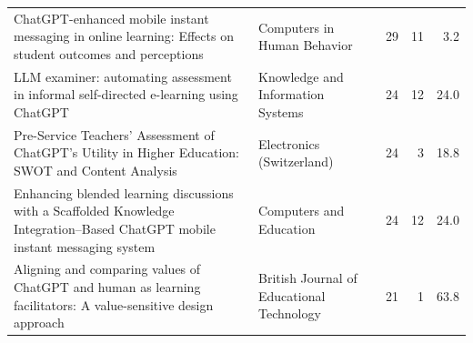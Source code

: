 \begin{table}[htbp]
{\begin{tabular}{@{}p{7cm}p{4cm}rrr@{}}
\rowcolor{white}
ChatGPT-enhanced mobile instant messaging in online learning: Effects on student outcomes and perceptions & Computers in Human Behavior & 29 & 11 & 3.2 \\
\rowcolor{gray!15}
LLM examiner: automating assessment in informal self-directed e-learning using ChatGPT & Knowledge and Information Systems & 24 & 12 & 24.0 \\
\rowcolor{white}
Pre-Service Teachers’ Assessment of ChatGPT’s Utility in Higher Education: SWOT and Content Analysis & Electronics (Switzerland) & 24 & 3 & 18.8 \\
\rowcolor{gray!15}
Enhancing blended learning discussions with a Scaffolded Knowledge Integration–Based ChatGPT mobile instant messaging system & Computers and Education & 24 & 12 & 24.0 \\
\rowcolor{white}
Aligning and comparing values of ChatGPT and human as learning facilitators: A value-sensitive design approach & British Journal of Educational Technology & 21 & 1 & 63.8 \\
\bottomrule
\end{tabular}
}
\end{table}
